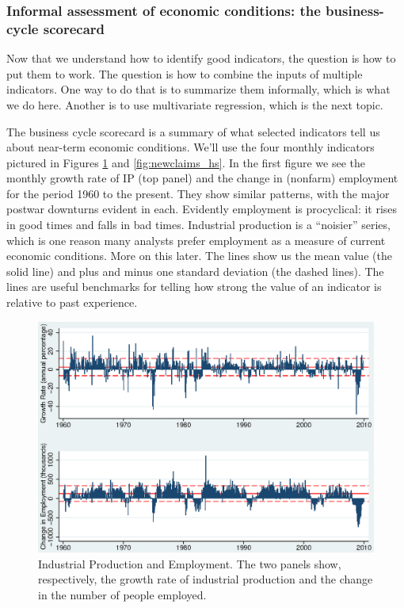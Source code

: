 \documentclass[letterpaper,12pt]{article}
\begin{document}
\subsubsection*{Informal assessment of economic conditions:  the business-cycle scorecard}

Now that we understand how to identify good indicators,
the question is how to put them to work.
The question is how to combine the inputs of multiple indicators.
One way to do that is to summarize them informally, which is what we do here.
Another is to use multivariate regression, which is the next topic.

The business cycle scorecard is a summary of
what selected indicators tell us about near-term economic conditions.
We'll use the four monthly indicators pictured
in Figures \ref{fig:ip_emp} and \ref{fig:newclaims_hs}.
In the first figure we see the monthly growth rate
of IP (top panel) and the change in (nonfarm) employment
for the period 1960 to the present.
They show similar patterns, with the major postwar
downturns evident in each.
Evidently employment is procyclical:  it rises in good times
and falls in bad times.
Industrial production is a ``noisier'' series, which is one reason
many analysts prefer employment as a measure of current economic
conditions.
More on this later.
The lines show us the mean value (the solid line)
and plus and minus
one standard deviation (the dashed lines).
The lines are useful benchmarks for telling how strong the
value of an indicator is relative to past experience.

\begin{figure}[h!]
    \centering
    \includegraphics[scale=0.8]{gmip_demp.eps}
    \caption{Industrial Production and Employment.
    The two panels show, respectively,
    the growth rate of industrial production and
    the change in the number of people employed.}
    \label{fig:ip_emp}%
\end{figure}
\end{document}
